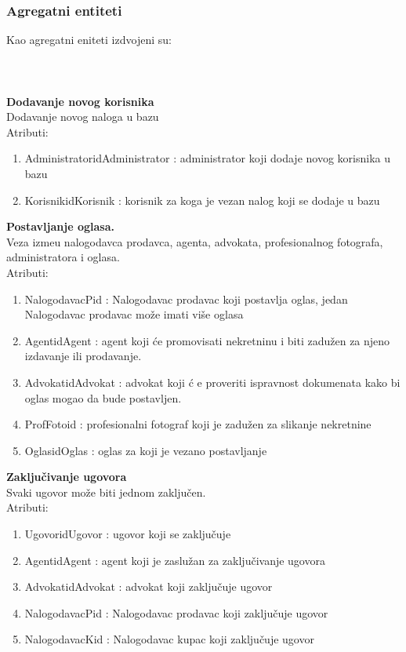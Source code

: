 \documentclass[20pt]{article}
\begin{document}
\newpage
\subsubsection{\bfseries \large Agregatni entiteti}
Kao agregatni eniteti izdvojeni su:\\
\\
\\
\\
{\bfseries Dodavanje novog korisnika}\\
Dodavanje novog naloga u bazu\\
\indent Atributi:
\begin{enumerate}
        \item  AdministratoridAdministrator : administrator koji dodaje novog korisnika u bazu
        \item KorisnikidKorisnik : korisnik za koga je vezan nalog koji se dodaje u bazu
\end{enumerate}
{\bfseries Postavljanje oglasa.}\\
Veza izme\dj u nalogodavca prodavca, agenta, advokata, profesionalnog fotografa, administratora i oglasa.\\
\indent Atributi:
\begin{enumerate}
        \item  NalogodavacPid : Nalogodavac prodavac koji postavlja oglas, jedan Nalogodavac prodavac mo\v {z}e imati vi\v {s}e oglasa
        \item  AgentidAgent : agent koji \' ce promovisati nekretninu i biti zadu\v {z}en za njeno izdavanje ili prodavanje.
        \item  AdvokatidAdvokat : advokat koji \'c e proveriti ispravnost dokumenata kako bi oglas mogao da bude postavljen.
        \item ProfFotoid : profesionalni fotograf koji je zadu\v {z}en za slikanje nekretnine
        \item OglasidOglas : oglas za koji je vezano postavljanje
\end{enumerate}
\newpage
{\bfseries Zaklju\v {c}ivanje ugovora}\\
Svaki ugovor mo\v {z}e biti jednom zaklju\v {c}en.\\
\indent Atributi:
\begin{enumerate}
        \item  UgovoridUgovor : ugovor koji se zaklju\v {c}uje
        \item  AgentidAgent : agent koji je zaslu\v {z}an za zaklju\v {c}ivanje ugovora
        \item  AdvokatidAdvokat : advokat koji zaklju\v {c}uje ugovor
        \item NalogodavacPid : Nalogodavac prodavac koji zaklju\v {c}uje ugovor
        \item NalogodavacKid : Nalogodavac kupac koji zaklju\v {c}uje ugovor
\end{enumerate}
\end{document}
